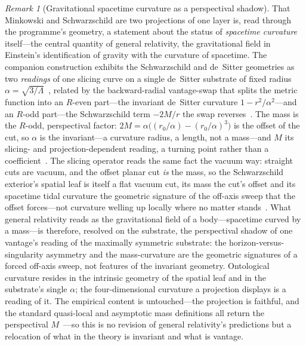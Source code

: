 \documentclass[11pt,a4paper]{article}
\theoremstyle{plain}
\theoremstyle{definition}
\theoremstyle{remark}
\newtheorem{remark}{Remark}
\begin{document}
\begin{remark}[Gravitational spacetime curvature as a perspectival shadow]
That Minkowski and Schwarzschild are two projections of one layer is, read through the programme's geometry, a statement about the status of \emph{spacetime curvature} itself---the central quantity of general relativity, the gravitational field in Einstein's identification of gravity with the curvature of spacetime. The companion construction exhibits the Schwarzschild and de~Sitter geometries as two \emph{readings} of one slicing curve on a single de~Sitter substrate of fixed radius $\alpha=\sqrt{3/\Lambda}$~\cite{JanzenSlicing}, related by the backward-radial vantage-swap that splits the metric function into an $R$-even part---the invariant de~Sitter curvature $1-r^2/\alpha^2$---and an $R$-odd part---the Schwarzschild term $-2M/r$ the swap reverses~\cite{JanzenGroupoid}. The mass is the $R$-odd, perspectival factor: $2M=\alpha\bigl((r_0/\alpha)-(r_0/\alpha)^3\bigr)$ is the offset of the cut, so $\alpha$ is the invariant---a curvature radius, a length, not a mass---and $M$ its slicing- and projection-dependent reading, a turning point rather than a coefficient~\cite{JanzenSlicing,JanzenGroupoid}. The slicing operator reads the same fact the vacuum way: straight cuts are vacuum, and the offset planar cut \emph{is} the mass, so the Schwarzschild exterior's spatial leaf is itself a flat vacuum cut, its mass the cut's offset and its spacetime tidal curvature the geometric signature of the off-axis sweep that the offset forces---not curvature welling up locally where no matter stands~\cite{JanzenOperator}. What general relativity reads as the gravitational field of a body---spacetime curved by a mass---is therefore, resolved on the substrate, the perspectival shadow of one vantage's reading of the maximally symmetric substrate: the horizon-versus-singularity asymmetry and the mass-curvature are the geometric signatures of a forced off-axis sweep, not features of the invariant geometry. Ontological curvature resides in the intrinsic geometry of the spatial leaf and in the substrate's single $\alpha$; the four-dimensional curvature a projection displays is a reading of it. The empirical content is untouched---the projection is faithful, and the standard quasi-local and asymptotic mass definitions all return the perspectival $M$~\cite{JanzenGroupoid}---so this is no revision of general relativity's predictions but a relocation of what in the theory is invariant and what is vantage.


\end{remark}
\end{document}
